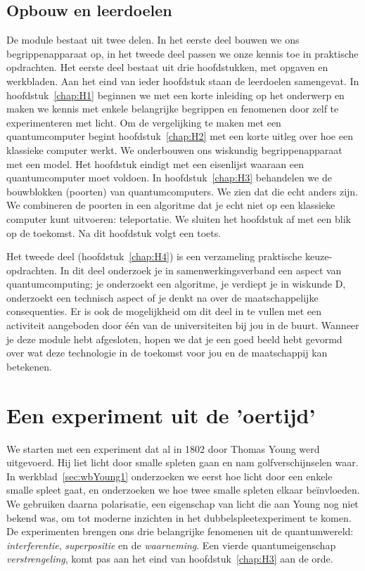 \documentclass[../../main.tex]{subfiles}
\begin{document}
\subsection*{Opbouw en leerdoelen}
De module bestaat uit twee delen. In het eerste deel bouwen we ons begrippenapparaat
op, in het tweede deel passen we onze kennis toe in praktische opdrachten. Het eerste deel bestaat uit drie hoofdstukken, met opgaven en werkbladen. Aan het eind van ieder hoofdstuk staan de leerdoelen samengevat. In hoofdstuk~\ref{chap:H1} beginnen we met een korte inleiding op het onderwerp en maken we kennis met enkele belangrijke begrippen en fenomenen door zelf te experimenteren met licht. Om de vergelijking te maken met een quantumcomputer begint hoofdstuk~\ref{chap:H2} met een korte uitleg over hoe een klassieke computer werkt. We onderbouwen ons wiskundig begrippenapparaat met een model. Het hoofdstuk eindigt met een eisenlijst waaraan een quantumcomputer moet voldoen. In hoofdstuk~\ref{chap:H3} behandelen we de bouwblokken (poorten) van quantumcomputers. We zien dat die echt anders zijn. We combineren de poorten in een algoritme dat je echt niet op een klassieke computer kunt uitvoeren: teleportatie. We sluiten het hoofdstuk af met een blik op de toekomst. Na dit hoofdstuk volgt een toets.

Het tweede deel (hoofdstuk~\ref{chap:H4}) is een verzameling praktische keuze-opdrachten.
In dit deel onderzoek je in samenwerkingsverband een aspect van quantumcomputing; je onderzoekt een algoritme, je verdiept je in wiskunde D, onderzoekt een technisch aspect of je denkt na over de maatschappelijke consequenties. Er is ook de mogelijkheid om dit deel in te vullen met een activiteit aangeboden door \'e\'en van de universiteiten bij jou in de buurt. Wanneer je deze module hebt afgesloten, hopen we dat je een goed beeld hebt gevormd over wat deze technologie in de toekomst voor jou en de maatschappij kan betekenen.

\section{Een experiment uit de 'oertijd'}
We starten met een experiment dat al in 1802 door Thomas Young werd uitgevoerd. Hij liet licht door smalle spleten gaan en nam golfverschijnselen waar. In werkblad~\ref{sec:wbYoung1} onderzoeken we eerst hoe licht door een enkele smalle spleet gaat, en onderzoeken we hoe twee smalle spleten elkaar be\"invloeden. We gebruiken daarna polarisatie, een eigenschap van licht die aan Young nog niet bekend was, om tot moderne inzichten in het dubbelspleetexperiment te komen. De experimenten brengen ons drie belangrijke fenomenen uit de quantumwereld: \textit{interferentie}, \textit{superpositie} en de \textit{waarneming}. Een vierde quantumeigenschap \textit{verstrengeling}, komt pas aan het eind van hoofdstuk~\ref{chap:H3} aan de orde.
\end{document}
